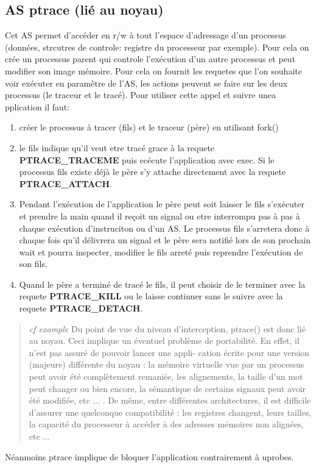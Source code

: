 \documentclass{article}
\begin{document}
\subsection{AS ptrace (lié au noyau)}
Cet AS permet d'accéder en r/w à tout l'espace d'adressage d'un processus
(données, strcutres de controle: registre du processeur par exemple). Pour cela
on crée un processus parent qui controle l'exécution d'un autre processus et
peut modifier son image mémoire. Pour cela on fournit les requetes que l'on
souhaite voir exécuter en paramètre de l'AS, les actions peuvent se faire sur
les deux processus (le traceur et le tracé). Pour utiliser cette appel et suivre
unea pplication il faut:
\begin{enumerate}
\item créer le processus à tracer (fils) et le traceur (père) en utilisant
  fork()
\item le fils indique qu'il veut etre tracé grace à la requete
  \textbf{PTRACE\_TRACEME} puis ecécute l'application avec exec. Si le processus
  fils existe déjà le père s'y attache directement avec la requete
  \textbf{PTRACE\_ATTACH}.
\item Pendant l'exécution de l'application le père peut soit laisser le fils
  s'exécuter et prendre la main quand il reçoit un signal ou etre interrompu pas
  à pas à chaque exécution d'instruciton ou d'un AS. Le processus fils
  s'arretera donc à chaque fois qu'il délivrera un signal et le père sera
  notifié lors de son prochain wait et pourra inspecter, modifier le fils arreté
  puis reprendre l'exécution de son fils.
\item Quand le père a terminé de tracé le fils, il peut choisir de le terminer
  avec la requete \textbf{PTRACE\_KILL} ou le laisse continuer sans le suivre
  avec la requete \textbf{PTRACE\_DETACH}.
\end{enumerate}

\begin{quotation}
\textit{cf example} {\color{green} Du point de vue du niveau d’interception,
  ptrace() est donc lié au noyau. Ceci implique un éventuel problème de
  portabilité. En effet, il n’est pas assuré de pouvoir lancer une appli- cation
  écrite pour une version (majeure) différente du noyau : la mémoire virtuelle
  vue par un processus peut avoir été complètement remaniée, les alignements, la
  taille d’un mot peut changer ou bien encore, la sémantique de certains signaux
  peut avoir été modifiée, etc ... . De même, entre différentes architectures,
  il est difficile d’assurer une quelconque compatibilité : les registres
  changent, leurs tailles, la capacité du processeur à accéder à des adresses
  mémoires non alignées, etc ...  }
\end{quotation}
Néanmoins ptrace implique de bloquer l'application contrairement à uprobes.
\end{document}
